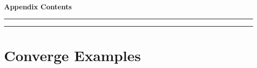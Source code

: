 \documentclass[11pt]{article}
\begin{document}



%


\clearpage 

\appendix

\clearpage 
\vspace*{-1.5\baselineskip}
\begingroup
\makeatletter
\setcounter{tocdepth}{2}

\vspace*{-0.25em}
\begin{center}
  {\large\bfseries Appendix Contents}\par
  \vspace{0.35em}
  \hrule
  \vspace{0.55em}
\end{center}

\small
\renewcommand{\baselinestretch}{1.5}\selectfont
\setlength{\parskip}{0pt}
\setlength{\parindent}{0pt}
\def\@dotsep{1.2} %

\renewcommand*\l@section[2]{%
  \vspace{0.15em}%
  \@dottedtocline{1}{0em}{2.0em}{\bfseries #1}{\bfseries #2}%
}

\renewcommand*\l@subsection[2]{%
  \@dottedtocline{2}{1.25em}{2.6em}{\footnotesize #1}{\footnotesize #2}%
}

\makeatother
\endgroup

\vspace{1.2em}
\hrule
\vspace{0.4em}


\section{Converge Examples}
\label{sec:appendix1}
\end{document}

